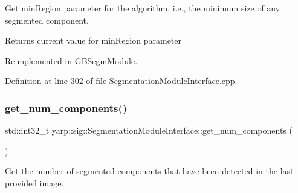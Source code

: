 Get min\+Region parameter for the algorithm, i.\+e., the minimum size of any segmented component. 

\begin{DoxyReturn}{Returns}
current value for min\+Region parameter 
\end{DoxyReturn}


Reimplemented in \mbox{\hyperlink{classGBSegmModule_a2378b95e60b406a119947aa86b5bb9c4}{G\+B\+Segm\+Module}}.



Definition at line 302 of file Segmentation\+Module\+Interface.\+cpp.


\begin{DoxyCode}{0}

\end{DoxyCode}
\mbox{\label{classyarp_1_1sig_1_1SegmentationModuleInterface_a253cb5a4d4250b97842537b664a93064}} 
\subsubsection{\texorpdfstring{get\_num\_components()}{get\_num\_components()}}
{\footnotesize\ttfamily std\+::int32\+\_\+t yarp\+::sig\+::\+Segmentation\+Module\+Interface\+::get\+\_\+num\+\_\+components (\begin{DoxyParamCaption}{ }\end{DoxyParamCaption})\hspace{0.3cm}{\ttfamily [virtual]}}



Get the number of segmented components that have been detected in the last provided image. 

